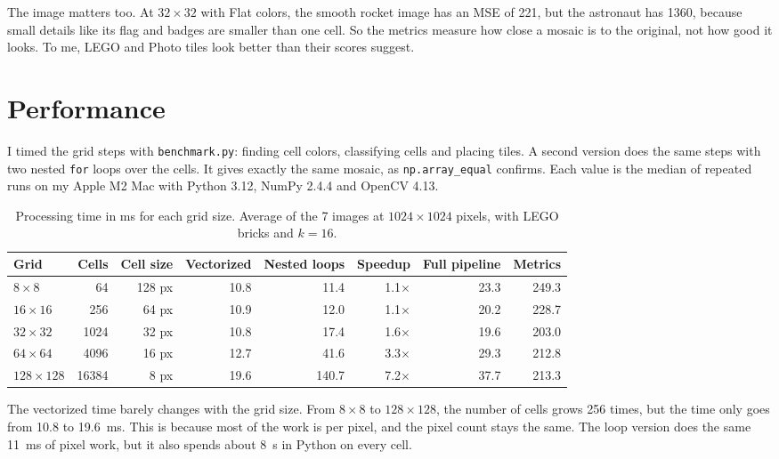 \documentclass[10pt]{article}
\begin{document}
The image matters too. At $32 \times 32$ with Flat colors, the smooth rocket image has an MSE of 221, but the astronaut has 1360, because small details like its flag and badges are smaller than one cell. So the metrics measure how close a mosaic is to the original, not how good it looks. To me, LEGO and Photo tiles look better than their scores suggest.

\section{Performance}
I timed the grid steps with \texttt{benchmark.py}: finding cell colors, classifying cells and placing tiles. A second version does the same steps with two nested \texttt{for} loops over the cells. It gives exactly the same mosaic, as \texttt{np.array\_equal} confirms. Each value is the median of repeated runs on my Apple M2 Mac with Python 3.12, NumPy 2.4.4 and OpenCV 4.13.

\begin{table}[!htb]
  \centering
  \caption{Processing time in ms for each grid size. Average of the 7 images at $1024 \times 1024$ pixels, with LEGO bricks and $k = 16$.}
  \label{tab:time}
  \small
  \begin{tabular}{l r r r r r r r}
    \toprule
    Grid & Cells & Cell size & Vectorized & Nested loops & Speedup & Full pipeline & Metrics \\
    \midrule
    $8 \times 8$     & 64     & 128 px & 10.8 & 11.4  & 1.1$\times$ & 23.3 & 249.3 \\
    $16 \times 16$   & 256    & 64 px  & 10.9 & 12.0  & 1.1$\times$ & 20.2 & 228.7 \\
    $32 \times 32$   & 1024   & 32 px  & 10.8 & 17.4  & 1.6$\times$ & 19.6 & 203.0 \\
    $64 \times 64$   & 4096   & 16 px  & 12.7 & 41.6  & 3.3$\times$ & 29.3 & 212.8 \\
    $128 \times 128$ & 16384  & 8 px   & 19.6 & 140.7 & 7.2$\times$ & 37.7 & 213.3 \\
    \bottomrule
  \end{tabular}
\end{table}

The vectorized time barely changes with the grid size. From $8 \times 8$ to $128 \times 128$, the number of cells grows 256 times, but the time only goes from 10.8 to 19.6~ms. This is because most of the work is per pixel, and the pixel count stays the same. The loop version does the same 11~ms of pixel work, but it also spends about 8~\textmu s in Python on every cell.
\end{document}
